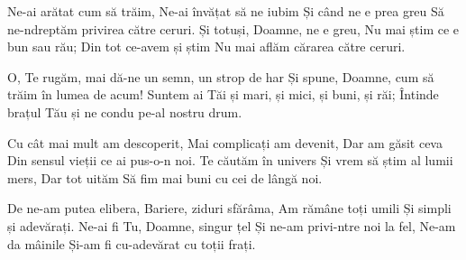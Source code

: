 \beginverse
Ne-ai arătat cum să trăim,
Ne-ai învățat să ne iubim
Și când ne e prea greu
Să ne-ndreptăm privirea către ceruri.
Și totuși, Doamne, ne e greu,
Nu mai știm ce e bun sau rău;
Din tot ce-avem și știm
Nu mai aflăm cărarea către ceruri.
\endverse

\beginchorus
O, Te rugăm, mai dă-ne un semn, un strop de har
Și spune, Doamne, cum să trăim în lumea de acum!
Suntem ai Tăi și mari, și mici, și buni, și răi;
Întinde brațul Tău și ne condu pe-al nostru drum.
\endchorus

\beginverse
Cu cât mai mult am descoperit,
Mai complicați am devenit,
Dar am găsit ceva
Din sensul vieții ce ai pus-o-n noi.
Te căutăm în univers
Și vrem să știm al lumii mers,
Dar tot uităm
Să fim mai buni cu cei de lângă noi.
\endverse

\beginverse
De ne-am putea elibera,
Bariere, ziduri sfărâma,
Am rămâne toți umili
Și simpli și adevărați.
Ne-ai fi Tu, Doamne, singur țel
Și ne-am privi-ntre noi la fel,
Ne-am da mâinile
Și-am fi cu-adevărat cu toții frați.
\endverse
\endsong